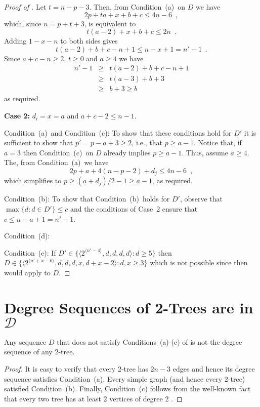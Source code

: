 \documentclass[lotsofwhite,charterfonts]{patmorin}
\newcommand{\rep}[1]{^{\langle#1\rangle}}
\newcommand{\degreesum}{Condition~(a)}
\newcommand{\maxdegree}{Condition~(b)}
\newcommand{\twotwos}{Condition~(c)}
\newcommand{\onebig}{Condition~(d)}
\newcommand{\fourds}{Condition~(e)}
\begin{document}
\begin{proof}[Proof of ]
Let $t=n-p-3$.  Then, from \degreesum\ on $D$ we have
\[
     2p + ta + x + b + c  \le 4n-6 \enspace , 
\]
which, since $n=p+t+3$, is equivalent to 
\[
     t(a-2) + x + b + c  \le 2n \enspace .
\]
Adding $1-x-n$ to both sides gives
\[
     t(a-2) + b + c - n + 1\le n - x + 1 = n' - 1\enspace .
\]
Since $a+c-n \ge 2$, $t\ge 0$ and $a\ge 4$ we have
\begin{eqnarray*}
     n'-1 & \ge & t(a-2) + b + c - n + 1 \\
          & \ge & t(a-3) + b + 3 \\
          & \ge & b+3 \ge b
\end{eqnarray*}
as required.

\noindent\textbf{Case 2:} $d_i=x=a$ and $a+c-2 \le n-1$.

\noindent\degreesum\ and \twotwos:  To show that these conditions hold for $D'$
it is sufficient to show that $p'=p-a+3 \ge 2$, i.e., that $p\ge a-1$.
Notice that, if $a=3$ then \twotwos\ on $D$ already implies $p\ge
a-1$.  Thus, assume $a\ge 4$.  The, from \degreesum\ we have
\[
      2p + a + 4(n-p-2) + d_j \le 4n-6 \enspace ,
\]
which simplifies to $p\ge (a+d_j)/2 -1 \ge a-1$, as required.

\noindent\maxdegree: To show that \maxdegree\ holds for $D'$, observe that
$\max\{d:d\in D'\}\le c$ and the conditions of Case~2 ensure that
$c \le n-a+1= n'-1$.

\noindent\onebig:

\noindent\fourds:
If $D'\in \{\langle 2\rep{n'-4},d,d,d,d\rangle : d\ge 5\}$ then
$D\in\{\langle 2\rep{n'+x-6},d,d,d,x,d+x-2\rangle : d,x\ge 3\}$ which
is not possible since then  would apply to $D$.
\end{proof}


\section{Degree Sequences of 2-Trees are in $\mathcal{D}$}

\begin{lem}
Any sequence $D$ that does not satisfy Conditions~(a)-(c) of
 is not the degree sequence of any 2-tree.
\end{lem}

\begin{proof}
It is easy to verify that every 2-tree has $2n-3$ edges and hence
its degree sequence satisfies Condition~(a).
Every simple graph (and hence every 2-tree) satisfied Condition~(b).
Finally, Condition~(c) follows from the 
well-known fact that every two tree has at least 2 vertices of degree
2 \cite{X}.
\end{proof}
\end{document}

